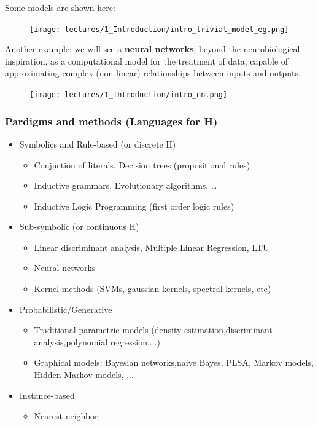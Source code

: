 \documentclass[../main.tex]{subfiles}
\begin{document}
Some models are shown here:
\begin{figure}[H]
    \centering
    \texttt{[image: lectures/1\_Introduction/intro\_trivial\_model\_eg.png]}
\end{figure}

Another example: we will see a \textbf{neural networks}, beyond the neurobiological inspiration, as a computational model for the treatment of data, capable of approximating complex (non-linear) relationships between inputs and outputs.
\begin{figure}[H]
    \centering
    \texttt{[image: lectures/1\_Introduction/intro\_nn.png]}
\end{figure}
\subsubsection{Pardigms and methods (Languages for H)}
\begin{itemize}
    \item Symbolics and Rule-based (or discrete H)
    \begin{itemize}
        \item Conjuction of literals, Decision trees (propositional rules)
        \item Inductive grammars, Evolutionary algorithms, …
        \item Inductive Logic Programming (first order logic rules)
    \end{itemize}
    \item Sub-symbolic (or continuous H)
    \begin{itemize}
        \item Linear discriminant analysis, Multiple Linear Regression, LTU
        \item Neural networks
        \item Kernel methods (SVMs, gaussian kernels, spectral kernels, etc)
    \end{itemize}
    \item Probabilistic/Generative
    \begin{itemize}
        \item Traditional parametric models (density estimation,discriminant analysis,polynomial regression,...)
        \item Graphical models: Bayesian networks,naive Bayes, PLSA, Markov models, Hidden Markov models, ...
    \end{itemize}
    \item Instance-based
    \begin{itemize}
        \item Nearest neighbor
    \end{itemize}
\end{itemize}
\end{document}
